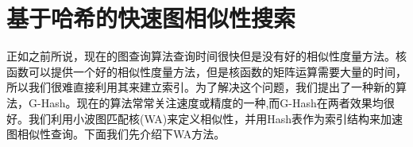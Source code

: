 \documentclass{article}
\begin{document}
\else

\fi
\section{基于哈希的快速图相似性搜索}
正如之前所说，现在的图查询算法查询时间很快但是没有好的相似性度量方法。核函数可以提供一个好的相似性度量方法，但是核函数的矩阵运算需要大量的时间，所以我们很难直接利用其来建立索引。为了解决这个问题，我们提出了一种新的算法，G-Hash。现在的算法常常关注速度或精度的一种,而G-Hash在两者效果均很好。我们利用小波图匹配核(WA)来定义相似性，并用Hash表作为索引结构来加速图相似性查询。下面我们先介绍下WA方法。

\ifx\allfiles\undefined
%
%
\end{document}
